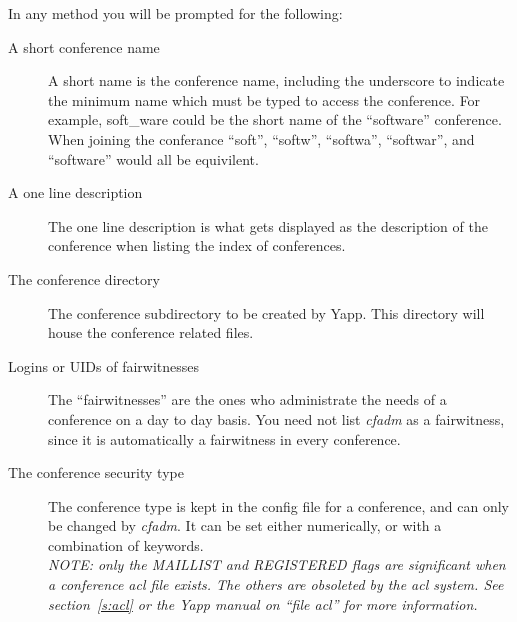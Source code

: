 \documentclass[twoside]{report}
\begin{document}
      In any method you will be prompted for the following:
      \begin{description}
      \item[A short conference name]
         \mbox{}\newline
         A short name is the conference name, including the underscore to 
         indicate the minimum name which must be typed to access the 
         conference.  
         For example, soft\_ware could be the short name of the ``software'' 
         conference.  When joining the conferance ``soft'', ``softw'', 
         ``softwa'', ``softwar'', and ``software'' would all be equivilent.

      \item[A one line description]
         \mbox{}\newline
         The one line description is what gets displayed as the description 
         of the conference when listing the index of conferences.

      \item[The conference directory]
         \mbox{}\newline
         The conference subdirectory to be created by Yapp.  This directory 
         will house the conference related files.

      \item[Logins or UIDs of fairwitnesses]
         \mbox{}\newline
         The ``fairwitnesses'' are the ones who administrate the needs of a 
         conference on a day to day basis. You need not list {\em cfadm} as a 
         fairwitness, since it is automatically a fairwitness in every 
         conference.

      \item[The conference security type]
         \mbox{}\newline
         The conference type is kept in the config file for a conference, and 
         can only be changed by {\em cfadm}.  It can be set either 
         numerically, or with a combination of keywords.\\

         {\em NOTE: only the MAILLIST and REGISTERED flags are 
              significant when a conference acl file exists.  The 
              others are obsoleted by the acl system. See section~\ref{s:acl} 
              or the Yapp manual on ``file acl'' for more information.
         }


\end{description}
\end{document}
